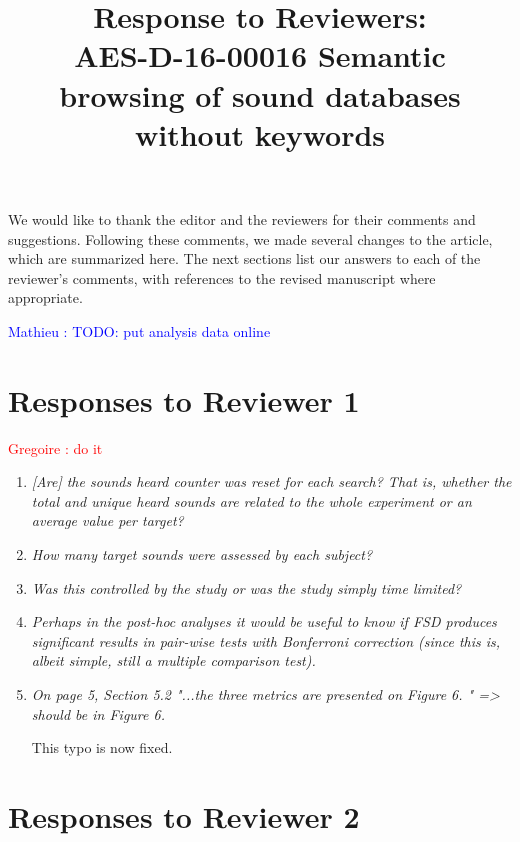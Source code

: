\documentclass[10pt]{article}
\title{Response to Reviewers: \\ AES-D-16-00016
Semantic browsing of sound databases without keywords}
\newcommand{\gl}[1]{\textcolor{red}{Gregoire : #1}}
\newcommand{\ml}[1]{\textcolor{blue}{ Mathieu : #1}}
\begin{document}
\maketitle

We would like to thank the editor and the reviewers for their comments and suggestions. Following these comments, we made several changes to the article, which are summarized here. The next sections list our answers to each of the reviewer’s comments, with references to the revised manuscript where appropriate.

\ml{TODO: put analysis data online}

\section{Responses to Reviewer 1}

\gl{do it}

\begin{enumerate}

\item \emph{[Are] the sounds heard counter was reset for each search? That is, whether the total and unique heard sounds are related to the whole experiment or an average value per target?}

\item \emph{How many target sounds were assessed by each subject?}

\item \emph{Was this controlled by the study or was the study simply time limited?}

\item \emph{Perhaps in the post-hoc analyses it would be useful to know if FSD produces significant results in pair-wise tests with Bonferroni correction (since this is, albeit simple, still a multiple comparison test).}

\item \emph{On page 5, Section 5.2  "...the three metrics are presented on Figure 6. " => should be in Figure 6.}

This typo is now fixed.

\end{enumerate}

\section{Responses to Reviewer 2}
\end{document}
